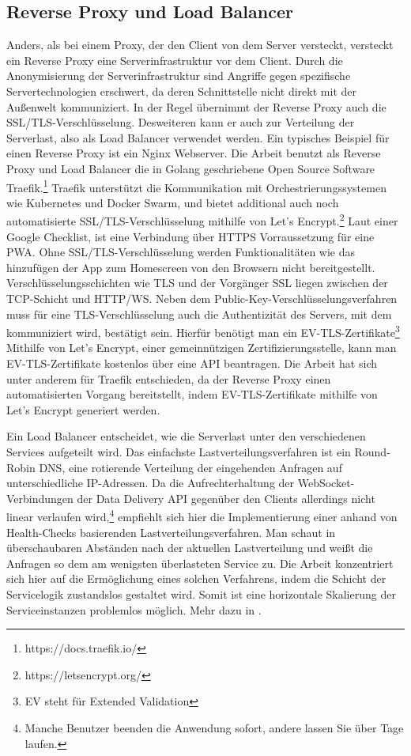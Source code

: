 \subsection{Reverse Proxy und Load Balancer}
\label{subsec:reverseproxyundloadbalancer}
Anders, als bei einem Proxy, der den Client von dem Server versteckt, versteckt ein Reverse Proxy
eine Serverinfrastruktur vor dem Client. Durch die Anonymisierung der Serverinfrastruktur
sind Angriffe gegen spezifische Servertechnologien erschwert, da deren Schnittstelle
nicht direkt mit der Außenwelt kommuniziert. In der Regel übernimmt der Reverse Proxy
auch die SSL/TLS-Verschlüsselung. Desweiteren kann er auch zur Verteilung der Serverlast,
also als Load Balancer verwendet werden. Ein typisches Beispiel für einen Reverse Proxy
ist ein Nginx Webserver. Die Arbeit benutzt als Reverse Proxy und Load Balancer die
in Golang geschriebene Open Source Software Traefik.\footnote{https://docs.traefik.io/}
Traefik unterstützt die Kommunikation mit Orchestrierungssystemen wie Kubernetes
und Docker Swarm, und bietet additional auch noch automatisierte SSL/TLS-Verschlüsselung
mithilfe von Let's Encrypt.\footnote{https://letsencrypt.org/} Laut einer Google Checklist,
ist eine Verbindung über HTTPS Vorraussetzung für eine PWA.\cite{GooglePWAChecklist}
Ohne SSL/TLS-Verschlüsselung werden Funktionalitäten wie das hinzufügen der App zum Homescreen
von den Browsern nicht bereitgestellt. Verschlüsselungsschichten wie TLS und der Vorgänger
SSL liegen zwischen der TCP-Schicht und HTTP/WS. Neben dem Public-Key-Verschlüsselungsverfahren
muss für eine TLS-Verschlüsselung auch die Authentizität des Servers, mit dem kommuniziert wird,
bestätigt sein. Hierfür benötigt man ein EV-TLS-Zertifikate\footnote{EV steht für Extended Validation}
Mithilfe von Let's Encrypt, einer gemeinnützigen Zertifizierungsstelle, kann man EV-TLS-Zertifikate
kostenlos über eine API beantragen. Die Arbeit hat sich unter anderem für Traefik entschieden,
da der Reverse Proxy einen automatisierten Vorgang bereitstellt, indem EV-TLS-Zertifikate
mithilfe von Let's Encrypt generiert werden.

Ein Load Balancer entscheidet, wie die Serverlast unter den verschiedenen Services aufgeteilt wird.
Das einfachste Lastverteilungsverfahren ist ein Round-Robin DNS, eine rotierende Verteilung
der eingehenden Anfragen auf unterschiedliche IP-Adressen.\cite{CloudflareRoundRobinDNS} 
Da die Aufrechterhaltung der WebSocket-Verbindungen der Data Delivery API gegenüber
den Clients allerdings nicht linear verlaufen wird,\footnote{Manche Benutzer beenden die Anwendung sofort, andere lassen Sie über Tage laufen.}
empfiehlt sich hier die Implementierung einer anhand von Health-Checks basierenden
Lastverteilungsverfahren. Man schaut in überschaubaren Abständen nach der aktuellen
Lastverteilung und weißt die Anfragen so dem am wenigsten überlasteten Service zu.
Die Arbeit konzentriert sich hier auf die Ermöglichung eines solchen Verfahrens,
indem die Schicht der Servicelogik zustandslos gestaltet wird. Somit ist eine
horizontale Skalierung der Serviceinstanzen problemlos möglich. Mehr dazu in
.

